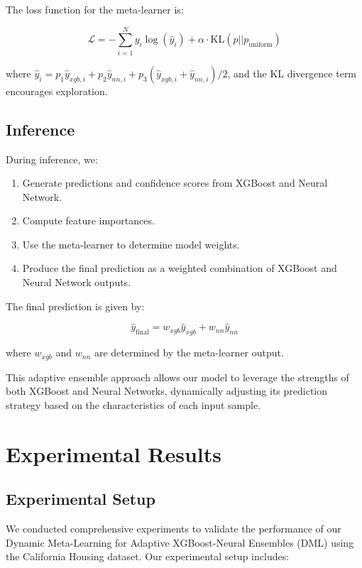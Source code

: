 \documentclass[10pt,journal,compsoc]{IEEEtran}
\begin{document}
The loss function for the meta-learner is:

\begin{equation}
    \mathcal{L} = -\sum_{i=1}^N y_i \log(\hat{y}_i) + \alpha \cdot \text{KL}(p || p_\text{uniform})
\end{equation}

where $\hat{y}_i = p_1 \hat{y}_{xgb,i} + p_2 \hat{y}_{nn,i} + p_3 (\hat{y}_{xgb,i} + \hat{y}_{nn,i})/2$, and the KL divergence term encourages exploration.

\subsection{Inference}

During inference, we:
\begin{enumerate}
    \item Generate predictions and confidence scores from XGBoost and Neural Network.
    \item Compute feature importances.
    \item Use the meta-learner to determine model weights.
    \item Produce the final prediction as a weighted combination of XGBoost and Neural Network outputs.
\end{enumerate}

The final prediction is given by:

\begin{equation}
    \hat{y}_\text{final} = w_{xgb} \hat{y}_{xgb} + w_{nn} \hat{y}_{nn}
\end{equation}

where $w_{xgb}$ and $w_{nn}$ are determined by the meta-learner output.

This adaptive ensemble approach allows our model to leverage the strengths of both XGBoost and Neural Networks, dynamically adjusting its prediction strategy based on the characteristics of each input sample.


\section{Experimental Results}

\subsection{Experimental Setup}

We conducted comprehensive experiments to validate the performance of our Dynamic Meta-Learning for Adaptive XGBoost-Neural Ensembles (DML) using the California Housing dataset. Our experimental setup includes:
\end{document}
